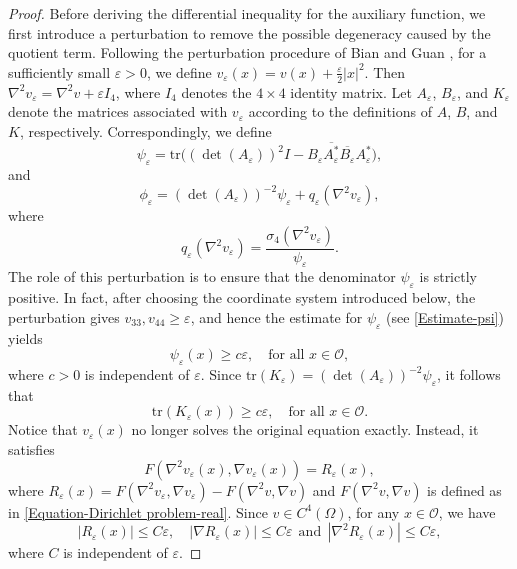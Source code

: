 \documentclass[11pt]{amsart}
\numberwithin{theorem}{section}
\numberwithin{equation}{section}
\begin{document}
\begin{proof}
Before deriving the differential inequality for the auxiliary function, we first introduce a perturbation to remove the possible degeneracy caused by the quotient term. Following the perturbation procedure of Bian and Guan \cite{Bian-Guan2009}, for a sufficiently small $\varepsilon>0$, we define $v_\varepsilon(x)=v(x)+\frac{\varepsilon}{2}|x|^2$. Then $\nabla^2v_\varepsilon=\nabla^2v+\varepsilon I_4$, where $I_4$ denotes the $4\times 4$ identity matrix. Let $A_\varepsilon$, $B_\varepsilon$, and $K_\varepsilon$ denote the matrices associated with $v_\varepsilon$ according to the definitions of $A$, $B$, and $K$, respectively. Correspondingly, we define $$\psi_\varepsilon=\mathrm{tr}\big((\det(A_\varepsilon))^2I-B_\varepsilon\overline{A^\ast_\varepsilon}\overline{B_\varepsilon}A^\ast_\varepsilon\big),$$ and $$\phi_\varepsilon=(\det(A_\varepsilon))^{-2}\psi_\varepsilon+q_\varepsilon(\nabla^2v_\varepsilon),$$ where $$q_\varepsilon(\nabla^2v_\varepsilon)=\frac{\sigma_4(\nabla^2v_\varepsilon)}{\psi_\varepsilon}.$$ The role of this perturbation is to ensure that the denominator $\psi_\varepsilon$ is strictly positive. In fact, after choosing the coordinate system introduced below, the perturbation gives $v_{33},v_{44}\geq\varepsilon$, and hence the estimate for $\psi_\varepsilon$ (see \eqref{Estimate-psi}) yields $$\psi_\varepsilon(x)\geq c\varepsilon,\quad \mbox{for all $x\in\mathcal{O}$},$$ where $c>0$ is independent of $\varepsilon$. Since $\mathrm{tr}(K_\varepsilon)=(\det(A_\varepsilon))^{-2}\psi_\varepsilon$, it follows that
\begin{equation}\label{Estimate-varepsilon}
\mathrm{tr}(K_\varepsilon(x))\geq c\varepsilon,\quad\mbox{for all $x\in\mathcal{O}$}.
\end{equation}
Notice that $v_\varepsilon(x)$ no longer solves the original equation exactly. Instead, it satisfies
\begin{equation}\label{Equation-F-varepsilon}
F(\nabla^2v_\varepsilon(x),\nabla v_\varepsilon(x))=R_\varepsilon(x),
\end{equation}
where $R_\varepsilon(x)=F(\nabla^2v_\varepsilon,\nabla v_\varepsilon)-F(\nabla^2v,\nabla v)$ and $F(\nabla^2v,\nabla v)$ is defined as in \eqref{Equation-Dirichlet problem-real}. Since $v\in C^4(\Omega)$, for any $x\in\mathcal{O}$, we have
\begin{equation}\label{Estimate-R}
|R_\varepsilon(x)|\leq C\varepsilon,\quad |\nabla R_\varepsilon(x)|\leq C\varepsilon\ \ \mathrm{and}\ 
\ |\nabla^2R_\varepsilon(x)|\leq C\varepsilon,
\end{equation}
where $C$ is independent of $\varepsilon$.


\end{proof}
\end{document}
